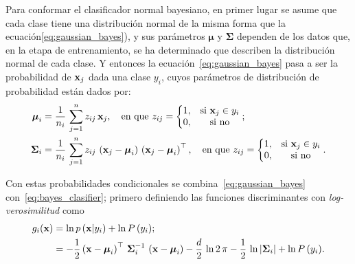 Para conformar el clasificador normal bayesiano, en primer lugar se asume que cada clase tiene una distribución normal de la misma forma que la ecuación\eqref{eq:gaussian_bayes}), y sus parámetros $\boldsymbol{\mu}$ y $\boldsymbol{\Sigma}$ dependen de los datos que, en la etapa de entrenamiento, se ha determinado que describen la distribución normal de cada clase.
Y entonces la ecuación~\eqref{eq:gaussian_bayes} pasa a ser la probabilidad de $\mathrm{\mathbf{x}}_j$ dada una clase $y_i$, cuyos parámetros de distribución de probabilidad están dados por:
%
\begin{subequations}
    \begin{align}
        \boldsymbol{\mu}_i &= \frac{1}{n_i}\,\sum_{j = 1}^{n} z_{ij}\,\vect{x}_j, \quad \text{en que }
        z_{ij} = \left\{\begin{matrix}
                            1, & \text{si } \vect{x}_j \in y_i \\
                            0, & \text{si no}
        \end{matrix}\right.;\label{eq:gaussian_mean_class} \\
        \boldsymbol{\Sigma}_i &= \frac{1}{n_i}\,\sum_{j = 1}^{n} z_{ij}\,
        \left(\vect{x}_j - \boldsymbol{\mu}_i\right)\,
        \left(\vect{x}_j - \boldsymbol{\mu}_i\right)^\top, \quad \text{en que }
        z_{ij} = \left\{\begin{matrix}
                            1, & \text{si } \vect{x}_j \in y_i \\
                            0, & \text{si no}
        \end{matrix}\right..\label{eq:gaussian_Sigma_class}
    \end{align}
\end{subequations}

Con estas probabilidades condicionales se combina~\eqref{eq:gaussian_bayes} con~\eqref{eq:bayes_clasifier}; primero definiendo las funciones discriminantes con \emph{log-verosimilitud} como
%
\begin{align}
    g_i(\vect{x}) &= \ln{p\left(\vect{x}|y_i\right)} + \ln{P\left(y_i\right)}; \nonumber \\
    &= - \frac{1}{2}\left(\vect{x} - \boldsymbol{\mu}_i\right)^\top\,\boldsymbol{\Sigma}_i^{-1}\,
    \left(\vect{x} - \boldsymbol{\mu}_i\right) - \frac{d}{2}\,\ln{2\,\pi}
    - \frac{1}{2}\,\ln{\left|\boldsymbol{\Sigma}_i\right|} + \ln{P\left(y_i\right)}. \label{eq:gaussian_discriminant_function}
\end{align}

